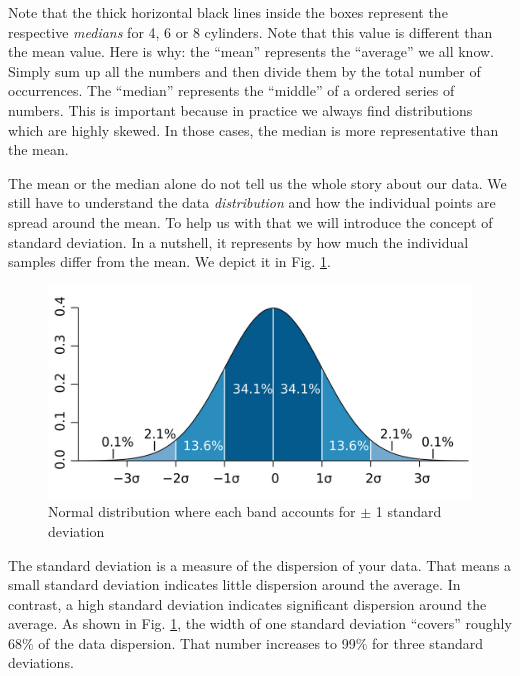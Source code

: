 \documentclass[10pt]{PhDthesisPSnPDF}%
\begin{document}
Note that the thick horizontal black lines inside the boxes represent the respective \textit{medians} for 4, 6 or 8 cylinders. Note that this value is different than the mean value. Here is why: the ``mean'' represents the ``average'' we all know. Simply sum up all the numbers and then divide them by the total number of occurrences. The ``median'' represents the ``middle'' of a ordered series of numbers. This is important because in practice we always find distributions which are highly skewed. In those cases, the median is more representative than the mean.

The mean or the median alone do not tell us the whole story about our data. We still have to understand the data \textit{distribution} and how the individual points are spread around the mean. To help us with that we will introduce the concept of standard deviation. In a nutshell, it represents by how much the individual samples differ from the mean. We depict it in Fig. \ref{fig:std}.

\begin{figure}[h]
	\begin{center}
			\includegraphics[scale=0.13]{stdch2}
	\end{center}
	\caption{Normal distribution where each band accounts for $\pm$ 1 standard deviation}
	\label{fig:std}
\end{figure} 

\newpage

The standard deviation is a measure of the dispersion of your data. That means a small standard deviation indicates little dispersion around the average. In contrast, a high standard deviation indicates significant dispersion around the average. As shown in Fig. \ref{fig:std}, the width of one standard deviation ``covers'' roughly 68$\%$ of the data dispersion. That number increases to 99$\%$ for three standard deviations.
\end{document}

